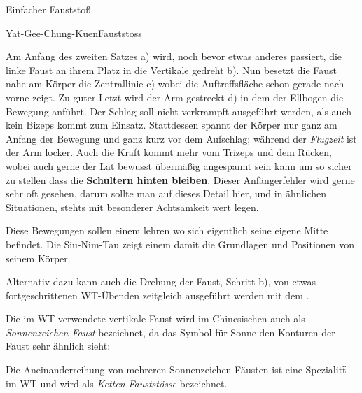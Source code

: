 
\begin{WTSatz}{Einfacher Fauststo{\ss}}%
	
	
	\begin{WTSatzTeil}{Yat-Gee-Chung-Kuen}{Fauststoss}
		
		Am Anfang des zweiten Satzes a) wird, noch bevor etwas anderes passiert, die linke Faust an ihrem Platz in die Vertikale gedreht b). Nun besetzt die Faust nahe am K\"orper die Zentrallinie c) wobei die Auftreffsfl\"ache schon gerade nach vorne zeigt. Zu guter Letzt wird der Arm gestreckt d) in dem der Ellbogen die Bewegung anf\"uhrt. Der Schlag soll nicht verkrampft ausgef\"uhrt werden, als auch kein Bizeps kommt zum Einsatz. Stattdessen spannt der K\"orper nur ganz am Anfang der Bewegung und ganz kurz vor dem Aufschlag; w\"ahrend der \textit{Flugzeit} ist der Arm locker. Auch die Kraft kommt mehr vom Trizeps und dem R\"ucken, wobei auch gerne der Lat bewusst \"uberm\"a{\ss}ig angespannt sein kann um so sicher zu stellen dass die \textbf{Schultern hinten bleiben}. Dieser Anf\"angerfehler wird gerne sehr oft gesehen, darum sollte man auf dieses Detail hier, und in \"ahnlichen Situationen, stehts mit besonderer Achtsamkeit wert legen.
		
		Diese Bewegungen sollen einem lehren wo sich eigentlich seine eigene Mitte befindet. Die Siu-Nim-Tau zeigt einem damit die Grundlagen und Positionen von seinem K\"orper.
		
		Alternativ dazu kann auch die Drehung der Faust, Schritt b), von etwas fortgeschrittenen WT-\"Ubenden zeitgleich ausgef\"uhrt werden mit dem .
		
	\begin{WTCommonBegriff}
		Die im WT verwendete vertikale Faust wird im Chinesischen auch als \textit{Sonnenzeichen-Faust} bezeichnet, da das Symbol f\"ur Sonne den Konturen der Faust sehr \"ahnlich sieht:
		
		\flushleft
		
		Die Aneinanderreihung von mehreren Sonnenzeichen-F\"austen ist eine Spezialit\"t im WT und wird als \textit{Ketten-Faustst\"osse} bezeichnet.
	\end{WTCommonBegriff}
			

\end{WTSatzTeil}
\end{WTSatz}
